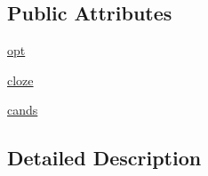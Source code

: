 \subsection*{Public Attributes}
\begin{DoxyCompactItemize}
\item 
\hyperlink{classparlai_1_1core_1_1teachers_1_1FbDialogTeacher_af7a9ec497b9cd0292d7b8fa220da7c28}{opt}
\item 
\hyperlink{classparlai_1_1core_1_1teachers_1_1FbDialogTeacher_a8505bfe962961b04961280a6e4c603f4}{cloze}
\item 
\hyperlink{classparlai_1_1core_1_1teachers_1_1FbDialogTeacher_a3ec67545250d8a877038667e3f4ea158}{cands}
\end{DoxyCompactItemize}


\subsection{Detailed Description}
